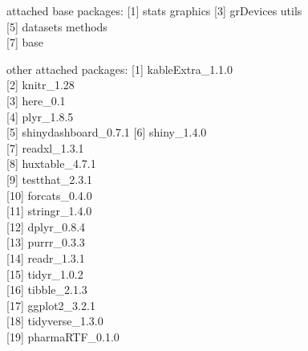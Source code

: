 \documentclass[]{article}
\begin{document}
attached base packages: {[}1{]} stats graphics {[}3{]} grDevices utils\\
{[}5{]} datasets methods\\
{[}7{]} base

other attached packages: {[}1{]} kableExtra\_1.1.0\\
{[}2{]} knitr\_1.28\\
{[}3{]} here\_0.1\\
{[}4{]} plyr\_1.8.5\\
{[}5{]} shinydashboard\_0.7.1 {[}6{]} shiny\_1.4.0\\
{[}7{]} readxl\_1.3.1\\
{[}8{]} huxtable\_4.7.1\\
{[}9{]} testthat\_2.3.1\\
{[}10{]} forcats\_0.4.0\\
{[}11{]} stringr\_1.4.0\\
{[}12{]} dplyr\_0.8.4\\
{[}13{]} purrr\_0.3.3\\
{[}14{]} readr\_1.3.1\\
{[}15{]} tidyr\_1.0.2\\
{[}16{]} tibble\_2.1.3\\
{[}17{]} ggplot2\_3.2.1\\
{[}18{]} tidyverse\_1.3.0\\
{[}19{]} pharmaRTF\_0.1.0
\end{document}
